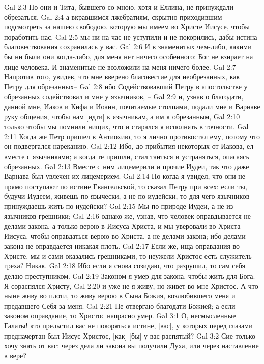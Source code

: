 Gal 2:3  Но они и Тита, бывшего со мною, хотя и Еллина, не принуждали обрезаться,
Gal 2:4  а вкравшимся лжебратиям, скрытно приходившим подсмотреть за нашею свободою, которую мы имеем во Христе Иисусе, чтобы поработить нас,
Gal 2:5  мы ни на час не уступили и не покорились, дабы истина благовествования сохранилась у вас.
Gal 2:6  И в знаменитых чем-либо, какими бы ни были они когда-либо, для меня нет ничего особенного: Бог не взирает на лице человека. И знаменитые не возложили на меня ничего более.
Gal 2:7  Напротив того, увидев, что мне вверено благовестие для необрезанных, как Петру для обрезанных--
Gal 2:8  ибо Содействовавший Петру в апостольстве у обрезанных содействовал и мне у язычников, --
Gal 2:9  и, узнав о благодати, данной мне, Иаков и Кифа и Иоанн, почитаемые столпами, подали мне и Варнаве руку общения, чтобы нам [идти] к язычникам, а им к обрезанным,
Gal 2:10  только чтобы мы помнили нищих, что и старался я исполнять в точности.
Gal 2:11  Когда же Петр пришел в Антиохию, то я лично противостал ему, потому что он подвергался нареканию.
Gal 2:12  Ибо, до прибытия некоторых от Иакова, ел вместе с язычниками; а когда те пришли, стал таиться и устраняться, опасаясь обрезанных.
Gal 2:13  Вместе с ним лицемерили и прочие Иудеи, так что даже Варнава был увлечен их лицемерием.
Gal 2:14  Но когда я увидел, что они не прямо поступают по истине Евангельской, то сказал Петру при всех: если ты, будучи Иудеем, живешь по-язычески, а не по-иудейски, то для чего язычников принуждаешь жить по-иудейски?
Gal 2:15  Мы по природе Иудеи, а не из язычников грешники;
Gal 2:16  однако же, узнав, что человек оправдывается не делами закона, а только верою в Иисуса Христа, и мы уверовали во Христа Иисуса, чтобы оправдаться верою во Христа, а не делами закона; ибо делами закона не оправдается никакая плоть.
Gal 2:17  Если же, ища оправдания во Христе, мы и сами оказались грешниками, то неужели Христос есть служитель греха? Никак.
Gal 2:18  Ибо если я снова созидаю, что разрушил, то сам себя делаю преступником.
Gal 2:19  Законом я умер для закона, чтобы жить для Бога. Я сораспялся Христу,
Gal 2:20  и уже не я живу, но живет во мне Христос. А что ныне живу во плоти, то живу верою в Сына Божия, возлюбившего меня и предавшего Себя за меня.
Gal 2:21  Не отвергаю благодати Божией; а если законом оправдание, то Христос напрасно умер.
Gal 3:1  О, несмысленные Галаты! кто прельстил вас не покоряться истине, [вас], у которых перед глазами предначертан был Иисус Христос, [как] [бы] у вас распятый?
Gal 3:2  Сие только хочу знать от вас: через дела ли закона вы получили Духа, или через наставление в вере?
